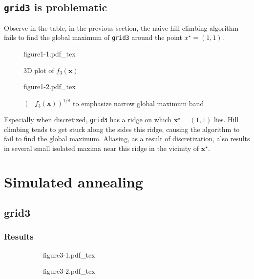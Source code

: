 \documentclass[11pt,oneside]{article}
\newcommand{\vect}[1]{\boldsymbol{#1}}
\begin{document}
\newpage

\subsection{\texttt{grid3} is problematic}

Observe in the table, in the previous section, the naive hill climbing algorithm fails
to find the global maximum of \texttt{grid3} around the point $x^\star=(1,1)$.

\begin{figure}[h!]
    \centering
    \caption{3D plot of $f_3(\vect{x})$}
    \def\svgwidth{0.6\textwidth}
    {figure1-1.pdf_tex}
\end{figure}

\begin{figure}[h!]
    \centering
    \caption{$(-f_3(\vect{x}))^{1/8}$ to emphasize narrow global maximum band}
    \def\svgwidth{0.5\textwidth}
    {figure1-2.pdf_tex}
\end{figure}

Especially when discretized, \texttt{grid3} has a ridge on which $\vect{x}^\star=(1,1)$
lies. Hill climbing tends to get stuck along the sides this ridge, causing the
algorithm to fail to find the global maximum. Aliasing, as a result of discretization,
also results in several small isolated maxima near this ridge in the vicinity of 
$\vect{x}^\star$.

\newpage

\section{Simulated annealing}

\subsection{grid3}

\subsubsection{Results}

\begin{figure}[h!]
    \caption{Simulated annealing with adaptive exponential cooling schedule}
    \centering
    \begin{subfigure}{0.5\textwidth}%
        \centering
        \def\svgwidth{\textwidth}
        {figure3-1.pdf_tex}
    \end{subfigure}%
    \begin{subfigure}{0.5\textwidth}%
        \centering
        \def\svgwidth{\textwidth}
        {figure3-2.pdf_tex}
    \end{subfigure}%
\end{figure}
\end{document}
